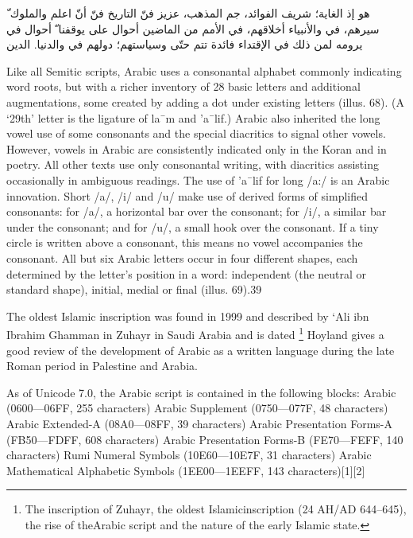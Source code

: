 \begin{Arabic}


ّ هو إذ الغاية؛ شريف الفوائد، جم المذهب، عزيز فنّ التاريخ فنّ أنّ اعلم
والملوك سيرهم، في والأنبياء أخلاقهم، في الأمم من الماضين أحوال على يوقفنا
ّ أحوال في يرومه لمن ذلك في الإقتداء فائدة تتم حتّى وسياستهم؛ دولهم في
والدنيا. الدين


\end{Arabic}

Like all Semitic scripts, Arabic uses a consonantal alphabet
commonly indicating word roots, but with a richer inventory of
28 basic letters and additional augmentations, some created by
adding a dot under existing letters (illus. 68). (A ‘29th’ letter is
the ligature of la¯m and ’a¯lif.) Arabic also inherited the long vowel
use of some consonants and the special diacritics to signal
other vowels. However, vowels in Arabic are consistently indicated
only in the Koran and in poetry. All other texts use only
consonantal writing, with diacritics assisting occasionally in
ambiguous readings. The use of ’a¯lif for long /a:/ is an Arabic
innovation. Short /a/, /i/ and /u/ make use of derived forms of
simplified consonants: for /a/, a horizontal bar over the consonant;
for /i/, a similar bar under the consonant; and for /u/, a
small hook over the consonant. If a tiny circle is written above a
consonant, this means no vowel accompanies the consonant. All
but six Arabic letters occur in four different shapes, each determined
by the letter’s position in a word: independent (the neutral
or standard shape), initial, medial or final (illus. 69).39

The oldest Islamic inscription was found in 1999 and described by ‘{}Ali ibn Ibrahim Ghamman in Zuhayr in 
Saudi Arabia and is dated \footnote{ 
The inscription of Zuhayr, the oldest Islamicinscription (24 AH/AD 644–645), the rise of theArabic script and the nature of the early Islamic state.} Hoyland\cite{hoyland2010} gives a good review of the development of Arabic as
a written language during the late Roman period in Palestine and Arabia. 




As of Unicode 7.0, the Arabic script is contained in the following blocks:
Arabic (0600—06FF, 255 characters)
Arabic Supplement (0750—077F, 48 characters)
Arabic Extended-A (08A0—08FF, 39 characters)
Arabic Presentation Forms-A (FB50—FDFF, 608 characters)
Arabic Presentation Forms-B (FE70—FEFF, 140 characters)
Rumi Numeral Symbols (10E60—10E7F, 31 characters)
Arabic Mathematical Alphabetic Symbols (1EE00—1EEFF, 143 characters)[1][2]

